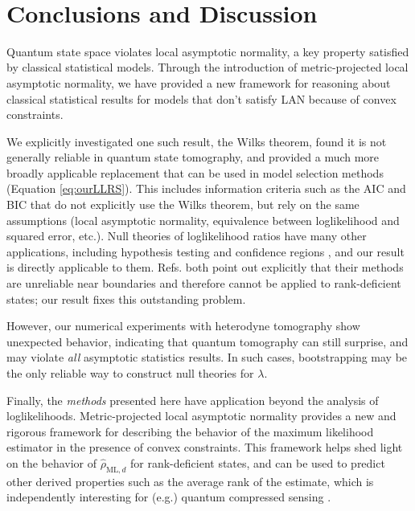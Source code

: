 \documentclass[aps,pra, twocolumn]{revtex4-1}
\newcommand{\rhohat}{\hat{\rho}}
\newcommand{\rhoML}[1]{\rhohat_{\scriptscriptstyle{\mathrm{ML},#1}}}
\begin{document}
~\\
\section{Conclusions and Discussion}
Quantum state space violates local asymptotic normality, a key property satisfied by classical statistical models. Through the introduction of metric-projected local asymptotic normality, we have provided a new framework for reasoning about classical statistical results for models that don't satisfy LAN because of convex constraints.

We explicitly investigated one such result, the Wilks theorem, found it is not generally reliable in quantum state tomography, and provided  a much more broadly applicable replacement that can be used in model selection methods (Equation \eqref{eq:ourLLRS}).  This includes information criteria such as the AIC and BIC \cite{Akaike1974, Schwarz1978, Kass1995, Burnham2004} that do not explicitly use the Wilks theorem, but rely on the same assumptions (local asymptotic normality, equivalence between loglikelihood and squared error, etc.).  Null theories of loglikelihood ratios have many other applications, including hypothesis testing \cite{Blume-Kohout2010,Moroder2013} and confidence regions \cite{Glancy2012a}, and our result is directly applicable to them.  Refs. \cite{Moroder2013,Glancy2012a} both point out explicitly that their methods are unreliable near boundaries and therefore cannot be applied to rank-deficient states; our result fixes this outstanding problem.

However, our numerical experiments with heterodyne tomography show unexpected behavior, indicating that quantum tomography can still surprise, and may violate \emph{all} asymptotic statistics results.  In such cases, bootstrapping \cite{Efron1979, Higgins2004} may be the only reliable way to construct null theories for $\lambda$. 

Finally, the \emph{methods} presented here have application beyond the analysis of loglikelihoods.  Metric-projected local asymptotic normality provides a new and rigorous framework for describing the behavior of the maximum likelihood estimator in the presence of convex constraints. This framework helps shed light on the behavior of $\rhoML{d}$ for rank-deficient states, and can be used to predict other derived properties such as the average rank of the estimate, which is independently interesting for (e.g.) quantum compressed sensing \cite{Flammia2012a, Steffens2016, Kalev2015, Kalev2015a}.
\end{document}

